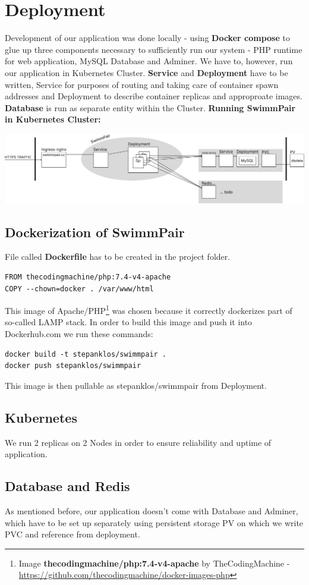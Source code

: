 \chapter{Deployment}
Development of our application was done locally - using \textbf{Docker compose} to glue up three components necessary to sufficiently run our system - PHP runtime for web application, MySQL Database and Adminer. We have to, however, run our application in Kubernetes Cluster. \textbf{Service} and \textbf{Deployment} have to be written, Service for purposes of routing and taking care of container spawn addresses and Deployment to describe container replicas and approproate images. \textbf{Database} is run as separate entity within the Cluster.
\newline
\textbf{Running SwimmPair in Kubernetes Cluster:}
\par
\includegraphics[scale=0.275]{img/swimmpair_deployment_k8s.png}
\section*{Dockerization of SwimmPair}
File called \textbf{Dockerfile} has to be created in the project folder.
\begin{lstlisting}
FROM thecodingmachine/php:7.4-v4-apache
COPY --chown=docker . /var/www/html
\end{lstlisting}
This image of Apache/PHP\footnote{Image \textbf{thecodingmachine/php:7.4-v4-apache}  by TheCodingMachine - \url{https://github.com/thecodingmachine/docker-images-php}} was chosen because it correctly dockerizes part of so-called LAMP stack. In order to build this image and push it into Dockerhub.com we run these commands:
\begin{lstlisting}
docker build -t stepanklos/swimmpair .
docker push stepanklos/swimmpair
\end{lstlisting}
This image is then pullable as stepanklos/swimmpair from Deployment.
\section*{Kubernetes}
We run 2 replicas on 2 Nodes in order to ensure reliability and uptime of application. 
\section*{Database and Redis}
As mentioned before, our application doesn't come with Database and Adminer, which have to be set up separately using persistent storage PV on which we write PVC and reference from deployment. 
